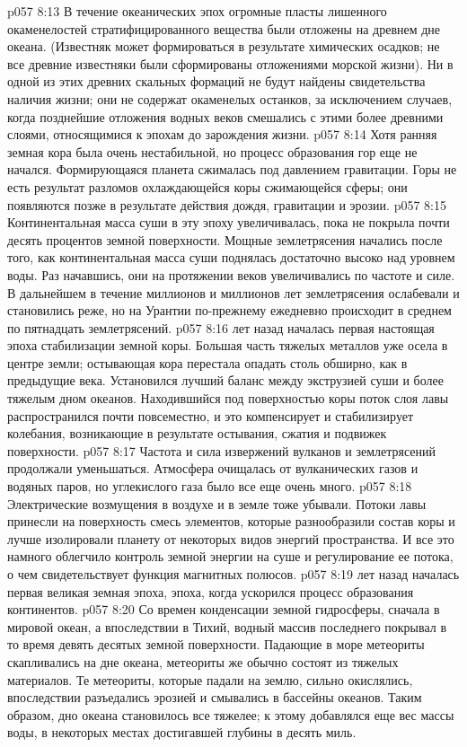 \vs p057 8:13 В течение океанических эпох огромные пласты лишенного окаменелостей стратифицированного вещества были отложены на древнем дне океана. (Известняк может формироваться в результате химических осадков; не все древние известняки были сформированы отложениями морской жизни). Ни в одной из этих древних скальных формаций не будут найдены свидетельства наличия жизни; они не содержат окаменелых останков, за исключением случаев, когда позднейшие отложения водных веков смешались с этими более древними слоями, относящимися к эпохам до зарождения жизни.
\vs p057 8:14 Хотя ранняя земная кора была очень нестабильной, но процесс образования гор еще не начался. Формирующаяся планета сжималась под давлением гравитации. Горы не есть результат разломов охлаждающейся коры сжимающейся сферы; они появляются позже в результате действия дождя, гравитации и эрозии.
\vs p057 8:15 Континентальная масса суши в эту эпоху увеличивалась, пока не покрыла почти десять процентов земной поверхности. Мощные землетрясения начались после того, как континентальная масса суши поднялась достаточно высоко над уровнем воды. Раз начавшись, они на протяжении веков увеличивались по частоте и силе. В дальнейшем в течение миллионов и миллионов лет землетрясения ослабевали и становились реже, но на Урантии по\hyp{}прежнему ежедневно происходит в среднем по пятнадцать землетрясений.
\vs p057 8:16 \pc {} лет назад началась первая настоящая эпоха стабилизации земной коры. Большая часть тяжелых металлов уже осела в центре земли; остывающая кора перестала опадать столь обширно, как в предыдущие века. Установился лучший баланс между экструзией суши и более тяжелым дном океанов. Находившийся под поверхностью коры поток слоя лавы распространился почти повсеместно, и это компенсирует и стабилизирует колебания, возникающие в результате остывания, сжатия и подвижек поверхности.
\vs p057 8:17 Частота и сила извержений вулканов и землетрясений продолжали уменьшаться. Атмосфера очищалась от вулканических газов и водяных паров, но углекислого газа было все еще очень много.
\vs p057 8:18 Электрические возмущения в воздухе и в земле тоже убывали. Потоки лавы принесли на поверхность смесь элементов, которые разнообразили состав коры и лучше изолировали планету от некоторых видов энергий пространства. И все это намного облегчило контроль земной энергии на суше и регулирование ее потока, о чем свидетельствует функция магнитных полюсов.
\vs p057 8:19 \pc {} лет назад началась первая великая земная эпоха, эпоха, когда ускорился процесс образования континентов.
\vs p057 8:20 Со времен конденсации земной гидросферы, сначала в мировой океан, а впоследствии в Тихий, водный массив последнего покрывал в то время девять десятых земной поверхности. Падающие в море метеориты скапливались на дне океана, метеориты же обычно состоят из тяжелых материалов. Те метеориты, которые падали на землю, сильно окислялись, впоследствии разъедались эрозией и смывались в бассейны океанов. Таким образом, дно океана становилось все тяжелее; к этому добавлялся еще вес массы воды, в некоторых местах достигавшей глубины в десять миль.
